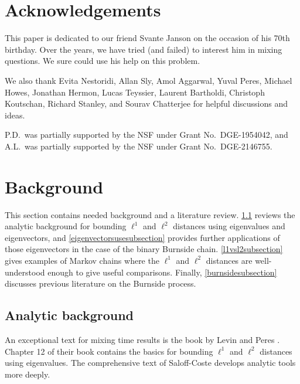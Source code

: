 \documentclass[11pt]{article}
\newcounter{r}
\newcounter{s}
\numberwithin{equation}{section}
\begin{document}
\section*{Acknowledgements}

This paper is dedicated to our friend Svante Janson on the occasion of his 70th birthday. Over the years, we have tried (and failed) to interest him in mixing questions. We sure could use his help on this problem.

We also thank Evita Nestoridi, Allan Sly, Amol Aggarwal, Yuval Peres, Michael Howes, Jonathan Hermon, Lucas Teyssier, Laurent Bartholdi, Christoph Koutschan, Richard Stanley, and Sourav Chatterjee for helpful discussions and ideas.

P.D.\ was partially supported by the NSF under Grant No.\ DGE-1954042, and A.L.\ was partially supported by the NSF under Grant No.\ DGE-2146755.

\section{Background}\label{backgroundreviewsection}

This section contains needed background and a literature review. \cref{analyticsubsection} reviews the analytic background for bounding $\ell^1$ and $\ell^2$ distances using eigenvalues and eigenvectors, and \cref{eigenvectorsusesubsection} provides further applications of those eigenvectors in the case of the binary Burnside chain. \cref{l1vsl2subsection} gives examples of Markov chains where the $\ell^1$ and $\ell^2$ distances are well-understood enough to give useful comparisons. Finally, \cref{burnsidesubsection} discusses previous literature on the Burnside process.

\subsection{Analytic background}\label{analyticsubsection}

An exceptional text for mixing time results is the book by Levin and Peres \cite{levinperes}. Chapter 12 of their book contains the basics for bounding $\ell^1$ and $\ell^2$ distances using eigenvalues. The comprehensive text of Saloff-Coste \cite{saloffcoste} develops analytic tools more deeply.
\end{document}
